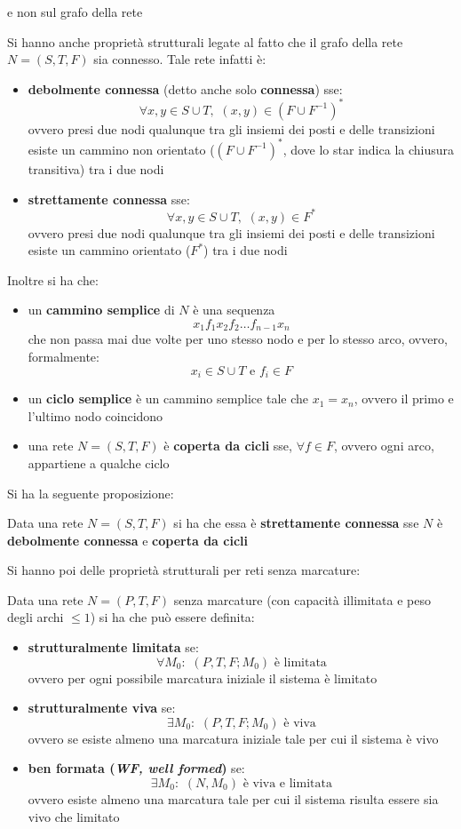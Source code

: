 \documentclass[a4paper,12pt, oneside]{book}
\begin{document}
\begin{definizione}
\begin{itemize}
{      e non sul grafo della rete}
  \end{itemize}
  Si hanno anche proprietà strutturali legate al fatto che il grafo della rete
  $N=(S,T,F)$ sia connesso. Tale rete infatti è:
  \begin{itemize}
    \item \textbf{debolmente connessa} (detto anche solo \textbf{connessa}) sse:
    \[\forall x,y\in S\cup T,\,\,(x,y)\in(F\cup F^{-1})^*\]
    ovvero presi due nodi qualunque tra gli insiemi dei posti e delle
    transizioni esiste un cammino non orientato ($(F\cup F^{-1})^*$, dove lo
    star indica la chiusura transitiva) tra i due nodi
    \item \textbf{strettamente connessa} sse:
    \[\forall x,y\in S\cup T,\,\,(x,y)\in F^*\]
    ovvero presi due nodi qualunque tra gli insiemi dei posti e delle
    transizioni esiste un cammino orientato ($F^*$) tra i due nodi 
  \end{itemize}
  Inoltre si ha che:
  \begin{itemize}
    \item un \textbf{cammino semplice} di $N$ è una sequenza
    \[x_1f_1x_2f_2\ldots f_{n-1}x_n\]
    che non passa mai due volte per uno stesso nodo e per lo stesso arco,
    ovvero, formalmente: 
    \[x_i\in S\cup T \mbox{ e } f_i\in F\]
    \item un \textbf{ciclo semplice} è un cammino semplice tale che $x_1 = x_n$,
    ovvero il primo e l'ultimo nodo coincidono
    \item una rete $N = (S, T , F )$ è \textbf{coperta da cicli} sse, $\forall
    f\in F$, ovvero ogni arco, appartiene a qualche ciclo
  \end{itemize}
\end{definizione}
Si ha la seguente proposizione:
\begin{center}
  Data una rete $N=(S,T,F)$ si ha che essa è \textbf{strettamente connessa} sse
  $N$ è \textbf{debolmente connessa} e \textbf{coperta da cicli}
\end{center}
\newpage
Si hanno poi delle proprietà strutturali per reti senza marcature:
\begin{definizione}
  Data una rete $N=(P,T,F)$ senza marcature (con capacità illimitata e peso
  degli archi $\leq 1$) si ha che può essere definita:
  \begin{itemize}
    \item \textbf{strutturalmente limitata} se:
    \[\forall M_0:\,\,(P,T,F;M_0) \mbox{ è limitata}\]
    ovvero per ogni possibile marcatura iniziale il sistema è limitato
    \item \textbf{strutturalmente viva} se:
    \[\exists M_0:\,\,(P,T,F;M_0) \mbox{ è viva}\]
    ovvero se esiste almeno una marcatura iniziale tale per cui il sistema è
    vivo 
    \item \textbf{ben formata (\textit{WF, well formed})} se:
    \[\exists M_0:\,\,(N,M_0) \mbox{ è viva e limitata}\]
    ovvero esiste almeno una marcatura tale per cui il sistema risulta essere
    sia vivo che limitato
  \end{itemize}
\end{definizione}
\end{document}
